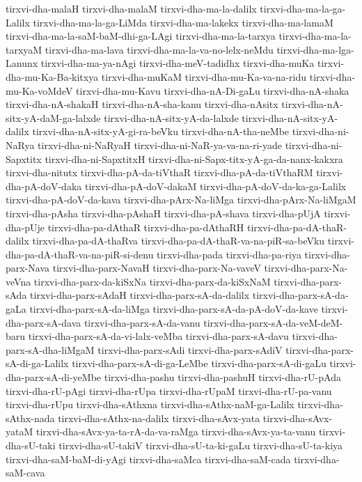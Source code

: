 {tirxvi-dha-malaH
tirxvi-dha-malaM
tirxvi-dha-ma-la-dalilx
tirxvi-dha-ma-la-ga-Lalilx
tirxvi-dha-ma-la-ga-LiMda
tirxvi-dha-ma-lakekx
tirxvi-dha-ma-lamaM
tirxvi-dha-ma-la-saM-baM-dhi-ga-LAgi
tirxvi-dha-ma-la-tarxya
tirxvi-dha-ma-la-tarxyaM
tirxvi-dha-ma-lava
tirxvi-dha-ma-la-va-no-lelx-neMdu
tirxvi-dha-ma-lga-Lanunx
tirxvi-dha-ma-ya-nAgi
tirxvi-dha-meV-tadidhx
tirxvi-dha-muKa
tirxvi-dha-mu-Ka-Ba-kitxya
tirxvi-dha-muKaM
tirxvi-dha-mu-Ka-va-na-ridu
tirxvi-dha-mu-Ka-voMdeV
tirxvi-dha-mu-Kavu
tirxvi-dha-nA-Di-gaLu
tirxvi-dha-nA-shaka
tirxvi-dha-nA-shakaH
tirxvi-dha-nA-sha-kanu
tirxvi-dha-nAsitx
tirxvi-dha-nA-sitx-yA-daM-ga-lalxde
tirxvi-dha-nA-sitx-yA-da-lalxde
tirxvi-dha-nA-sitx-yA-dalilx
tirxvi-dha-nA-sitx-yA-gi-ra-beVku
tirxvi-dha-nA-tha-neMbe
tirxvi-dha-ni-NaRya
tirxvi-dha-ni-NaRyaH
tirxvi-dha-ni-NaR-ya-va-na-ri-yade
tirxvi-dha-ni-Sapxtitx
tirxvi-dha-ni-SapxtitxH
tirxvi-dha-ni-Sapx-titx-yA-ga-da-nanx-kakxra
tirxvi-dha-nitutx
tirxvi-dha-pA-da-tiVthaR
tirxvi-dha-pA-da-tiVthaRM
tirxvi-dha-pA-doV-daka
tirxvi-dha-pA-doV-dakaM
tirxvi-dha-pA-doV-da-ka-ga-Lalilx
tirxvi-dha-pA-doV-da-kava
tirxvi-dha-pArx-Na-liMga
tirxvi-dha-pArx-Na-liMgaM
tirxvi-dha-pAsha
tirxvi-dha-pAshaH
tirxvi-dha-pA-shava
tirxvi-dha-pUjA
tirxvi-dha-pUje
tirxvi-dha-pa-dAthaR
tirxvi-dha-pa-dAthaRH
tirxvi-dha-pa-dA-thaR-dalilx
tirxvi-dha-pa-dA-thaRva
tirxvi-dha-pa-dA-thaR-va-na-piR-sa-beVku
tirxvi-dha-pa-dA-thaR-va-na-piR-si-denu
tirxvi-dha-pada
tirxvi-dha-pa-riya
tirxvi-dha-parx-Nava
tirxvi-dha-parx-NavaH
tirxvi-dha-parx-Na-vaveV
tirxvi-dha-parx-Na-veVna
tirxvi-dha-parx-da-kiSxNa
tirxvi-dha-parx-da-kiSxNaM
tirxvi-dha-parx-sAda
tirxvi-dha-parx-sAdaH
tirxvi-dha-parx-sA-da-dalilx
tirxvi-dha-parx-sA-da-gaLa
tirxvi-dha-parx-sA-da-liMga
tirxvi-dha-parx-sA-da-pA-doV-da-kave
tirxvi-dha-parx-sA-dava
tirxvi-dha-parx-sA-da-vanu
tirxvi-dha-parx-sA-da-veM-deM-baru
tirxvi-dha-parx-sA-da-vi-lalx-veMba
tirxvi-dha-parx-sA-davu
tirxvi-dha-parx-sA-dha-liMgaM
tirxvi-dha-parx-sAdi
tirxvi-dha-parx-sAdiV
tirxvi-dha-parx-sA-di-ga-Lalilx
tirxvi-dha-parx-sA-di-ga-LeMbe
tirxvi-dha-parx-sA-di-gaLu
tirxvi-dha-parx-sA-di-yeMbe
tirxvi-dha-pashu
tirxvi-dha-pashuH
tirxvi-dha-rU-pAda
tirxvi-dha-rU-pAgi
tirxvi-dha-rUpa
tirxvi-dha-rUpaM
tirxvi-dha-rU-pa-vanu
tirxvi-dha-rUpu
tirxvi-dha-sAthxna
tirxvi-dha-sAthx-naM-ga-Lalilx
tirxvi-dha-sAthx-nada
tirxvi-dha-sAthx-na-dalilx
tirxvi-dha-sAvx-yata
tirxvi-dha-sAvx-yataM
tirxvi-dha-sAvx-ya-ta-rA-da-va-raMga
tirxvi-dha-sAvx-ya-ta-vanu
tirxvi-dha-sU-taki
tirxvi-dha-sU-takiV
tirxvi-dha-sU-ta-ki-gaLu
tirxvi-dha-sU-ta-kiya
tirxvi-dha-saM-baM-di-yAgi
tirxvi-dha-saMca
tirxvi-dha-saM-cada
tirxvi-dha-saM-cava
}
